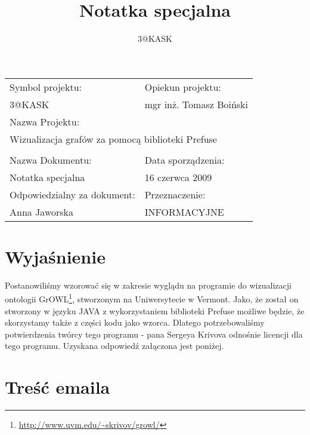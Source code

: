 \documentclass[a4paper,10pt]{article}
\title{Notatka specjalna}
\author{3@KASK}
\begin{document}



\maketitle


\begin{center}
\begin{tabular}{|p{7cm}|p{7cm}|}
\hline
Symbol projektu: & Opiekun projektu:   \tabularnewline
3@KASK & mgr inż. Tomasz Boiński    \tabularnewline \hline
\multicolumn{2}{|l|}{Nazwa Projektu: } \tabularnewline
\multicolumn{2}{|l|}{Wizualizacja grafów za pomocą biblioteki Prefuse } \tabularnewline
\hline
\multicolumn{2}{l}{ } \tabularnewline %
\hline
Nazwa Dokumentu: & Data sporządzenia:   \tabularnewline
Notatka specjalna & 16 czerwca 2009 \tabularnewline \hline
Odpowiedzialny za dokument: & Przeznaczenie:   \tabularnewline
Anna Jaworska & INFORMACYJNE \tabularnewline \hline
\end{tabular}
\end{center}



\section{Wyjaśnienie}
Postanowiliśmy wzorować się w zakresie wyglądu na programie do wizualizacji ontologii  GrOWL\footnote{\url{http://www.uvm.edu/~skrivov/growl/}}, stworzonym na Uniwersytecie w Vermont. Jako, że został on stworzony w języku JAVA z wykorzystaniem biblioteki Prefuse możliwe będzie, że skorzystamy także z części kodu jako wzorca. Dlatego potrzebowaliśmy potwierdzenia twórcy tego programu - pana Sergeya Krivova odnośnie licencji dla tego programu. Uzyskana odpowiedź załączona jest poniżej.


\section{Treść emaila}
\end{document}
